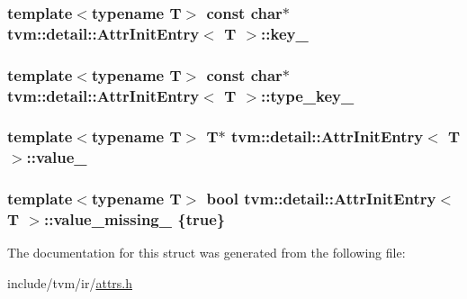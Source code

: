 \subsubsection[{\texorpdfstring{key\+\_\+}{key_}}]{\setlength{\rightskip}{0pt plus 5cm}template$<$typename T$>$ const char$\ast$ {\bf tvm\+::detail\+::\+Attr\+Init\+Entry}$<$ T $>$\+::key\+\_\+}\hypertarget{structtvm_1_1detail_1_1AttrInitEntry_a5ed0b852e3229c1c1e0b8c924c53479e}{}\label{structtvm_1_1detail_1_1AttrInitEntry_a5ed0b852e3229c1c1e0b8c924c53479e}
\subsubsection[{\texorpdfstring{type\+\_\+key\+\_\+}{type_key_}}]{\setlength{\rightskip}{0pt plus 5cm}template$<$typename T$>$ const char$\ast$ {\bf tvm\+::detail\+::\+Attr\+Init\+Entry}$<$ T $>$\+::type\+\_\+key\+\_\+}\hypertarget{structtvm_1_1detail_1_1AttrInitEntry_a573a25648ca0d3d8fe28f6c7614248bf}{}\label{structtvm_1_1detail_1_1AttrInitEntry_a573a25648ca0d3d8fe28f6c7614248bf}
\subsubsection[{\texorpdfstring{value\+\_\+}{value_}}]{\setlength{\rightskip}{0pt plus 5cm}template$<$typename T$>$ T$\ast$ {\bf tvm\+::detail\+::\+Attr\+Init\+Entry}$<$ T $>$\+::value\+\_\+}\hypertarget{structtvm_1_1detail_1_1AttrInitEntry_aea83f0af9e7ea95e5f7d614a717b7760}{}\label{structtvm_1_1detail_1_1AttrInitEntry_aea83f0af9e7ea95e5f7d614a717b7760}
\subsubsection[{\texorpdfstring{value\+\_\+missing\+\_\+}{value_missing_}}]{\setlength{\rightskip}{0pt plus 5cm}template$<$typename T$>$ bool {\bf tvm\+::detail\+::\+Attr\+Init\+Entry}$<$ T $>$\+::value\+\_\+missing\+\_\+ \{true\}}\hypertarget{structtvm_1_1detail_1_1AttrInitEntry_aaba94dddd1e9c367023dbe03e76634bf}{}\label{structtvm_1_1detail_1_1AttrInitEntry_aaba94dddd1e9c367023dbe03e76634bf}


The documentation for this struct was generated from the following file\+:\begin{DoxyCompactItemize}
\item 
include/tvm/ir/\hyperlink{ir_2attrs_8h}{attrs.\+h}\end{DoxyCompactItemize}
